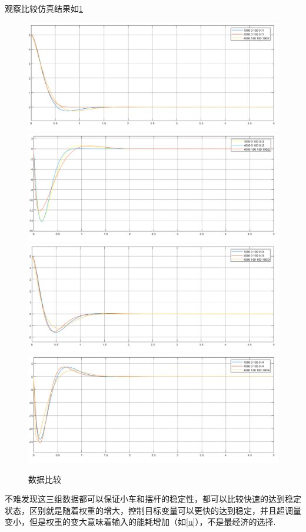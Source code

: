 \documentclass{MathorCupmodeling}
\begin{document}
观察比较仿真结果如\cref{数据比较}
\begin{figure}[hbpt]
\centering
\includegraphics[width=12cm]{x.png}
\includegraphics[width=12cm]{dotx.png}
\includegraphics[width=12cm]{fai.png}
\includegraphics[width=12cm]{dotfai.png}
\caption{数据比较}\label{数据比较}
\end{figure}

不难发现这三组数据都可以保证小车和摆杆的稳定性，都可以比较快速的达到稳定状态，区别就是随着权重的增大，控制目标变量可以更快的达到稳定，并且超调量变小，但是权重的变大意味着输入的能耗增加（如\cref{u}），不是最经济的选择.
\end{document}
